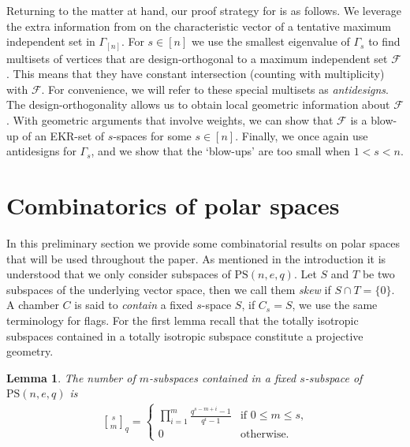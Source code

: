 \documentclass[11pt]{article}
\newtheorem{lemma}[thm]{Lemma}
\newcommand{\EKR}{\mathcal{F}}
\newcommand{\PS}{\mathrm{PS}}
\renewcommand{\le}{\leqslant}
\newcommand{\gauss}[2]{{#1\brack #2}}
\begin{document}
Returning to the matter at hand, our proof strategy for  is as follows. We leverage the extra information from  on the characteristic vector of a tentative maximum independent set in $\Gamma_{[n]}$. For $s\in [n]$ we use the smallest eigenvalue of $\Gamma_{s}$ to find multisets of vertices that are design-orthogonal to a maximum independent set $\EKR$. This means that they have constant intersection (counting with multiplicity) with $\EKR$. For convenience, we will refer to these special multisets as \textit{antidesigns}. The design-orthogonality allows us to obtain local geometric information about $\EKR$. With geometric arguments that involve weights, we can show that $\EKR$ is a blow-up of an EKR-set of $s$-spaces for some $s \in [n]$. Finally, we once again use antidesigns for $\Gamma_s$, and we show that the `blow-ups' are too small when $1<s<n$.



\section{Combinatorics of polar spaces}

In this preliminary section we provide some combinatorial results on polar spaces that will be used throughout the paper. As mentioned in the introduction it is understood that we only consider subspaces of $\PS(n,e,q)$. Let $S$ and $T$ be two subspaces of the underlying vector space, then we call them \emph{skew} if $S \cap T = \{0\}$. A chamber $C$ is said to \textit{contain} a fixed $s$-space $S$, if $C_s=S$, we use the same terminology for flags. For the first lemma recall that the totally isotropic subspaces contained in a totally isotropic subspace constitute a projective geometry.

\begin{lemma} \label{L: gaussian coefficient}
	The number of $m$-subspaces contained in a fixed $s$-subspace of $\PS(n,e,q)$ is 
   \begin{align*}
 \gauss{s}{m}_q=
 \begin{cases}
\displaystyle \prod_{i=1}^m\frac{q^{s-m+i}-1}{q^i-1} & \text{if $0\le m\le s$,}
\\
0 & \text{otherwise.} \end{cases}
\end{align*}
\end{lemma}
\end{document}
